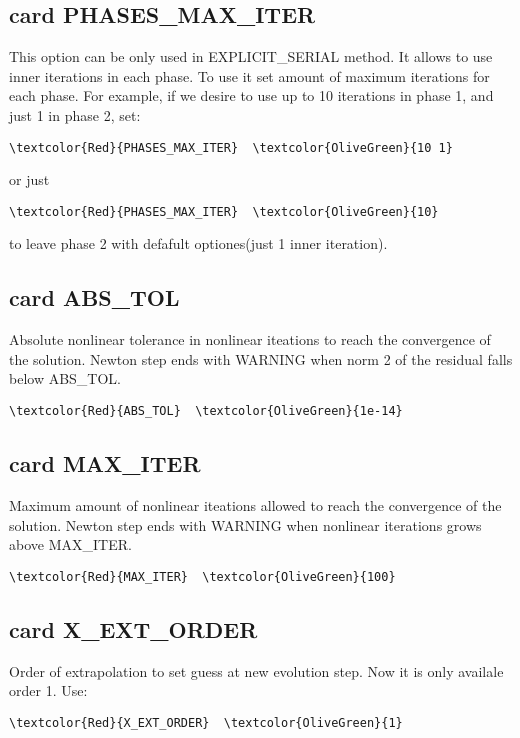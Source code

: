 \subsection{card PHASES_MAX_ITER}
This option can be only used in EXPLICIT_SERIAL method. It allows to use inner iterations in each phase. To use it set amount of maximum iterations for each phase. For example, if we desire to use up to 10 iterations in phase 1, and just 1 in phase 2, set:
\begin{Verbatim}[frame=single,commandchars=\\\{\}]
\textcolor{Red}{PHASES_MAX_ITER}  \textcolor{OliveGreen}{10 1}
\end{Verbatim}
or just
\begin{Verbatim}[frame=single,commandchars=\\\{\}]
\textcolor{Red}{PHASES_MAX_ITER}  \textcolor{OliveGreen}{10}
\end{Verbatim}
to leave phase 2 with defafult optiones(just 1 inner iteration).

\subsection{card ABS_TOL}
Absolute nonlinear tolerance in nonlinear iteations to reach the convergence of the solution. Newton step ends with WARNING when norm 2 of the residual falls below ABS_TOL.
\begin{Verbatim}[frame=single,commandchars=\\\{\}]
\textcolor{Red}{ABS_TOL}  \textcolor{OliveGreen}{1e-14}
\end{Verbatim}

\subsection{card MAX_ITER}
Maximum amount of nonlinear iteations allowed to reach the convergence of the solution. Newton step ends with WARNING when nonlinear iterations grows above MAX_ITER.
\begin{Verbatim}[frame=single,commandchars=\\\{\}]
\textcolor{Red}{MAX_ITER}  \textcolor{OliveGreen}{100}
\end{Verbatim}

\subsection{card X_EXT_ORDER}
Order of extrapolation to set guess at new evolution step. Now it is only availale order 1. Use:
\begin{Verbatim}[frame=single,commandchars=\\\{\}]
\textcolor{Red}{X_EXT_ORDER}  \textcolor{OliveGreen}{1}
\end{Verbatim}

